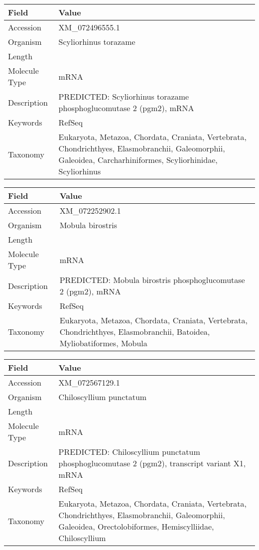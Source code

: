 \documentclass[10pt]{article}
\begin{document}
\vspace{1em}
{\footnotesize
\begin{longtable}{>{\raggedright\arraybackslash}p{4.5cm} >{\raggedright\arraybackslash}p{11.5cm}}
\textbf{Field} & \textbf{Value} \\
\hline
Accession & XM\_072496555.1 \\
Organism & Scyliorhinus torazame \\
Length & 6044 \\
Molecule Type & mRNA \\
Description & PREDICTED: Scyliorhinus torazame phosphoglucomutase 2 (pgm2), mRNA \\
Keywords & RefSeq \\
Taxonomy & Eukaryota, Metazoa, Chordata, Craniata, Vertebrata, Chondrichthyes, Elasmobranchii, Galeomorphii, Galeoidea, Carcharhiniformes, Scyliorhinidae, Scyliorhinus \\
\end{longtable}
}

\vspace{1em}
{\footnotesize
\begin{longtable}{>{\raggedright\arraybackslash}p{4.5cm} >{\raggedright\arraybackslash}p{11.5cm}}
\textbf{Field} & \textbf{Value} \\
\hline
Accession & XM\_072252902.1 \\
Organism & Mobula birostris \\
Length & 4020 \\
Molecule Type & mRNA \\
Description & PREDICTED: Mobula birostris phosphoglucomutase 2 (pgm2), mRNA \\
Keywords & RefSeq \\
Taxonomy & Eukaryota, Metazoa, Chordata, Craniata, Vertebrata, Chondrichthyes, Elasmobranchii, Batoidea, Myliobatiformes, Mobula \\
\end{longtable}
}

\vspace{1em}
{\footnotesize
\begin{longtable}{>{\raggedright\arraybackslash}p{4.5cm} >{\raggedright\arraybackslash}p{11.5cm}}
\textbf{Field} & \textbf{Value} \\
\hline
Accession & XM\_072567129.1 \\
Organism & Chiloscyllium punctatum \\
Length & 2717 \\
Molecule Type & mRNA \\
Description & PREDICTED: Chiloscyllium punctatum phosphoglucomutase 2 (pgm2), transcript variant X1, mRNA \\
Keywords & RefSeq \\
Taxonomy & Eukaryota, Metazoa, Chordata, Craniata, Vertebrata, Chondrichthyes, Elasmobranchii, Galeomorphii, Galeoidea, Orectolobiformes, Hemiscylliidae, Chiloscyllium \\
\end{longtable}
}
\end{document}
